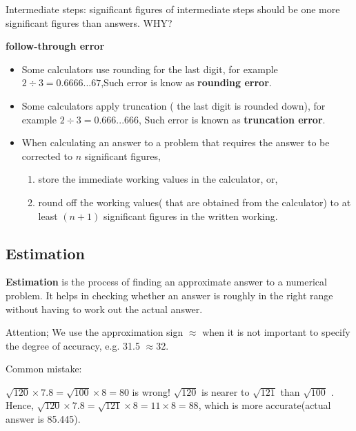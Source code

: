 \documentclass[../main]{subfiles}
\begin{document}
Intermediate steps:
significant figures of intermediate steps should be one more significant figures
than answers. WHY?

\textbf{follow-through error}

\begin{itemize}
\item Some calculators use rounding for the last digit, for example \( 2 \div 3
  = 0.6666...67 \),Such error is know as \textbf{rounding error}.
\item Some calculators apply truncation ( the last digit is rounded down), for
  example \(2 \div 3 = 0.666...666\), Such error is known as \textbf{truncation
    error}.
 
\item When calculating an answer to a problem that requires the answer to be
  corrected to \(n\) significant figures,

  \begin{enumerate}
  \item store the immediate working values in the calculator, or,
   
  \item round off the working values( that are obtained from the calculator) to
    at least \((n +1)\) significant figures in the written working.
  \end{enumerate}
\end{itemize}


\subsection{Estimation}

\textbf{Estimation} is the process of finding an approximate answer to a
numerical problem. It helps in checking whether an answer is roughly in the
right range without having to work out the actual answer.

Attention; We use the approximation sign $\approx$ when it is not important to
specify the degree of accuracy, e.g. 31.5 $\approx$32.

Common mistake:

\(\sqrt {120} \times 7.8 = \sqrt {100} \times 8 = 80 \) is wrong! \(\sqrt {120}\) is nearer
to \(\sqrt {121}\) than \(\sqrt {100}\) . Hence, \(\sqrt {120} \times 7.8 = \sqrt {121} \times 8 =
11 \times 8 = 88 \), which is more accurate(actual answer is 85.445).
\end{document}
